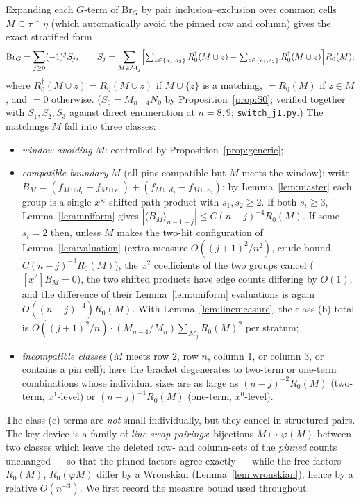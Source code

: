 \documentclass[11pt]{article}
\theoremstyle{definition}
\begin{document}
Expanding each $G$-term of $\mathrm{Br}_G$ by pair inclusion--exclusion
over common cells $M\subseteq\tau\cap\eta$ (which automatically avoid the
pinned row and column) gives the exact stratified form
\begin{equation}\label{eq:strata}
\mathrm{Br}_G=\sum_{j\ge0}(-1)^j S_j,\qquad
S_j=\sum_{M\in\mathcal M_j}\Bigl[\textstyle\sum_{z\in\{d_1,d_2\}}
R_0^\dagger(M\cup z)-\sum_{z\in\{e_1,e_2\}}R_0^\dagger(M\cup z)\Bigr]R_0(M),
\end{equation}
where $R_0^\dagger(M\cup z)=R_0(M\cup z)$ if $M\cup\{z\}$ is a matching,
$=R_0(M)$ if $z\in M$, and $=0$ otherwise.  ($S_0=M_{n-4}N_0$ by
Proposition~\ref{prop:S0}; verified together with $S_1,S_2,S_3$ against
direct enumeration at $n=8,9$; \texttt{switch\_j1.py}.)
The matchings $M$ fall into three classes:
\begin{itemize}[leftmargin=2em]
\item[\textup{(a)}] \emph{window-avoiding} $M$: controlled by
Proposition~\ref{prop:generic};
\item[\textup{(b)}] \emph{compatible boundary} $M$ (all pins compatible
but $M$ meets the window): write $B_M=(f_{M\cup d_1}-f_{M\cup e_1})
+(f_{M\cup d_2}-f_{M\cup e_2})$; by Lemma~\ref{lem:master} each group is
a single $x^{s_i}$-shifted path product with $s_1,s_2\ge2$.  If both
$s_i\ge3$, Lemma~\ref{lem:uniform} gives
$|\langle B_M\rangle_{n-1-j}|\le C(n-j)^{-4}R_0(M)$.  If some $s_i=2$
then, unless $M$ makes the two-hit configuration of
Lemma~\ref{lem:valuation} (extra measure $O((j{+}1)^2/n^2)$, crude bound
$C(n-j)^{-3}R_0(M)$), the $x^2$ coefficients of the two groups cancel
($[x^2]B_M=0$), the two shifted products have edge counts differing by
$O(1)$, and the difference of their Lemma~\ref{lem:uniform} evaluations
is again $O((n-j)^{-4})R_0(M)$.  With Lemma~\ref{lem:linemeasure}, the
class-(b) total is $O((j{+}1)^2/n)\cdot
(M_{n-4}/M_n)\sum_{\mathcal M_j}R_0(M)^2$ per stratum;
\item[\textup{(c)}] \emph{incompatible classes} ($M$ meets row $2$, row
$n$, column $1$, or column $3$, or contains a pin cell): here the bracket
degenerates to two-term or one-term combinations whose individual sizes
are as large as $(n-j)^{-2}R_0(M)$ (two-term, $x^1$-level) or
$(n-j)^{-1}R_0(M)$ (one-term, $x^0$-level).
\end{itemize}

The class-(c) terms are \emph{not} small individually, but they cancel
in structured pairs.  The key device is a family of \emph{line-swap
pairings}: bijections $M\mapsto\varphi(M)$ between two classes which
leave the deleted row- and column-sets of the \emph{pinned} counts
unchanged --- so that the pinned factors agree exactly --- while the
free factors $R_0(M)$, $R_0(\varphi M)$ differ by a Wronskian
(Lemma~\ref{lem:wronskian}), hence by a relative $O(n^{-3})$.  We first
record the measure bound used throughout.
\end{document}
